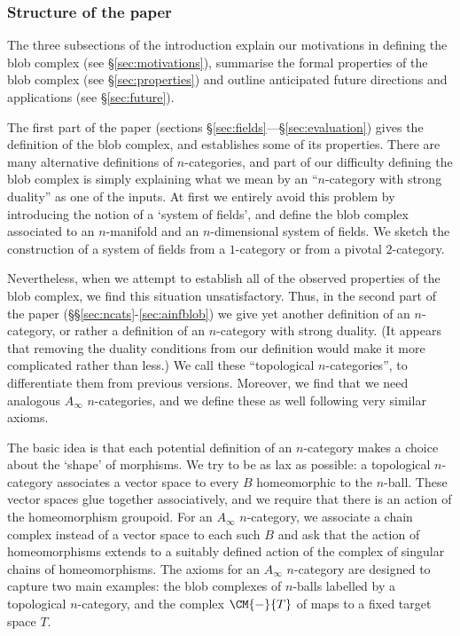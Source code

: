 \subsubsection{Structure of the paper}
The three subsections of the introduction explain our motivations in defining the blob complex (see \S \ref{sec:motivations}), summarise the formal properties of the blob complex (see \S \ref{sec:properties}) and outline anticipated future directions and applications (see \S \ref{sec:future}).

The first part of the paper (sections \S \ref{sec:fields}---\S \ref{sec:evaluation}) gives the definition of the blob complex, and establishes some of its properties. There are many alternative definitions of $n$-categories, and part of our difficulty defining the blob complex is simply explaining what we mean by an ``$n$-category with strong duality'' as one of the inputs. At first we entirely avoid this problem by introducing the notion of a `system of fields', and define the blob complex associated to an $n$-manifold and an $n$-dimensional system of fields. We sketch the construction of a system of fields from a $1$-category or from a pivotal $2$-category.

Nevertheless, when we attempt to establish all of the observed properties of the blob complex, we find this situation unsatisfactory. Thus, in the second part of the paper (\S\S \ref{sec:ncats}-\ref{sec:ainfblob}) we give yet another definition of an $n$-category, or rather a definition of an $n$-category with strong duality. (It appears that removing the duality conditions from our definition would make it more complicated rather than less.) We call these ``topological $n$-categories'', to differentiate them from previous versions. Moreover, we find that we need analogous $A_\infty$ $n$-categories, and we define these as well following very similar axioms.

The basic idea is that each potential definition of an $n$-category makes a choice about the `shape' of morphisms. We try to be as lax as possible: a topological $n$-category associates a vector space to every $B$ homeomorphic to the $n$-ball. These vector spaces glue together associatively, and we require that there is an action of the homeomorphism groupoid.
For an $A_\infty$ $n$-category, we associate a chain complex instead of a vector space to each such $B$ and ask that the action of homeomorphisms extends to a suitably defined action of the complex of singular chains of homeomorphisms. The axioms for an $A_\infty$ $n$-category are designed to capture two main examples: the blob complexes of $n$-balls labelled by a topological $n$-category, and the complex $\CM{-}{T}$ of maps to a fixed target space $T$.

